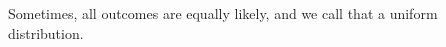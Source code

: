 \documentclass[preview]{standalone}
\begin{document}
\begin{center}
Sometimes, all outcomes are equally likely, and we call that a uniform distribution.
\end{center}
\end{document}
